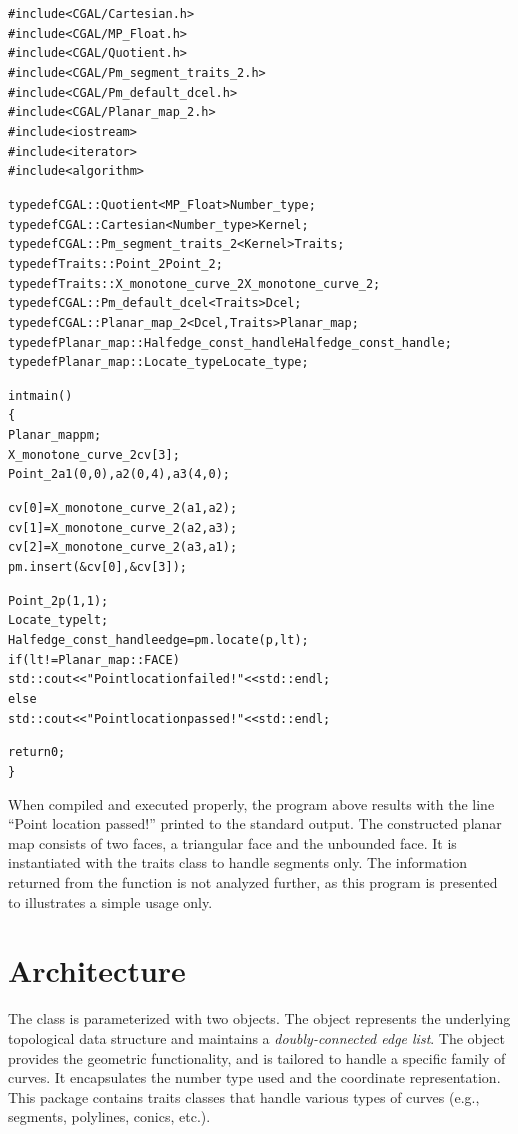 \begin{alltt}
#include <CGAL/Cartesian.h>
#include <CGAL/MP_Float.h>
#include <CGAL/Quotient.h>
#include <CGAL/Pm_segment_traits_2.h>
#include <CGAL/Pm_default_dcel.h>
#include <CGAL/Planar_map_2.h>
#include <iostream>
#include <iterator>
#include <algorithm>

typedef CGAL::Quotient<MP_Float>          Number_type;
typedef CGAL::Cartesian<Number_type>      Kernel;
typedef CGAL::Pm_segment_traits_2<Kernel> Traits;
typedef Traits::Point_2                   Point_2;
typedef Traits::X_monotone_curve_2        X_monotone_curve_2;
typedef CGAL::Pm_default_dcel<Traits>     Dcel;
typedef CGAL::Planar_map_2<Dcel,Traits>   Planar_map;
typedef Planar_map::Halfedge_const_handle Halfedge_const_handle;
typedef Planar_map::Locate_type           Locate_type;

int main()
\{
  Planar_map pm;
  X_monotone_curve_2 cv[3];
  Point_2 a1(0,0), a2(0,4), a3(4,0);
 
  cv[0] = X_monotone_curve_2(a1,a2);
  cv[1] = X_monotone_curve_2(a2,a3);
  cv[2] = X_monotone_curve_2(a3,a1);
  pm.insert(&cv[0], &cv[3]);

  Point_2 p(1,1);
  Locate_type lt;
  Halfedge_const_handle edge = pm.locate(p, lt);
  if (lt != Planar_map::FACE)
    std::cout << "Point location failed!" << std::endl;
  else
    std::cout << "Point location passed!" << std::endl;

  return 0;
\}
\end{alltt}

When compiled and executed properly, the program above results with
the line ``Point location passed!'' printed to the standard
output. The constructed planar map consists of two faces, a triangular
face and the unbounded face. It is instantiated with the
 traits class to handle segments only. The 
information returned from the  function is not analyzed
further, as this program is presented to illustrates a simple usage
only.

\section*{Architecture}
The  class is parameterized with two
objects. The  object represents the underlying topological
data structure and maintains a {\em doubly-connected edge list}. The
 object provides the geometric functionality, and is
tailored to handle a specific family of curves. It encapsulates the
number type used and the coordinate representation. This package
contains traits classes that handle various types of curves (e.g.,
segments, polylines, conics, etc.).

